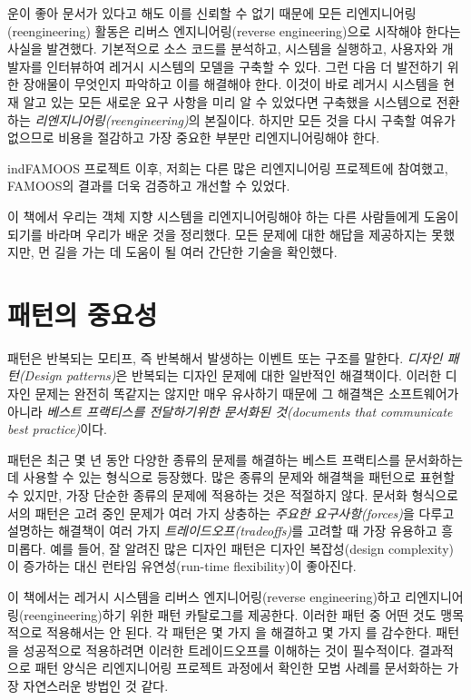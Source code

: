 \documentclass[a4paper,10pt,twoside]{book}
\begin{document}
운이 좋아 문서가 있다고 해도 이를 신뢰할 수 없기 때문에 모든 리엔지니어링(reengineering) 활동은 리버스 엔지니어링(reverse engineering)으로 시작해야 한다는 사실을 발견했다. 기본적으로 소스 코드를 분석하고, 시스템을 실행하고, 사용자와 개발자를 인터뷰하여 레거시 시스템의 모델을 구축할 수 있다. 그런 다음 더 발전하기 위한 장애물이 무엇인지 파악하고 이를 해결해야 한다. 이것이 바로 레거시 시스템을 현재 알고 있는 모든 새로운 요구 사항을 미리 알 수 있었다면 구축했을 시스템으로 전환하는 \emph{리엔지니어링(reengineering)}의 본질이다. 하지만 모든 것을 다시 구축할 여유가 없으므로 비용을 절감하고 가장 중요한 부분만 리엔지니어링해야 한다.

ind{FAMOOS} 프로젝트 이후, 저희는 다른 많은 리엔지니어링 프로젝트에 참여했고, FAMOOS의 결과를 더욱 검증하고 개선할 수 있었다.

이 책에서 우리는 객체 지향 시스템을 리엔지니어링해야 하는 다른 사람들에게 도움이 되기를 바라며 우리가 배운 것을 정리했다. 모든 문제에 대한 해답을 제공하지는 못했지만, 먼 길을 가는 데 도움이 될 여러 간단한 기술을 확인했다.

\section*{패턴의 중요성}
패턴은 반복되는 모티프, 즉 반복해서 발생하는 이벤트 또는 구조를 말한다. \emph{디자인 패턴(Design patterns)}은 반복되는 디자인 문제에 대한 일반적인 해결책이다\cite{Gamm95a}. 이러한 디자인 문제는 완전히 똑같지는 않지만 매우 유사하기 때문에 그 해결책은 소프트웨어가 아니라 \emph{베스트 프랙티스를 전달하기위한 문서화된 것(documents that communicate best practice)}이다.

패턴은 최근 몇 년 동안 다양한 종류의 문제를 해결하는 베스트 프랙티스를 문서화하는 데 사용할 수 있는 형식으로 등장했다. 많은 종류의 문제와 해결책을 패턴으로 표현할 수 있지만, 가장 단순한 종류의 문제에 적용하는 것은 적절하지 않다. 문서화 형식으로서의 패턴은 고려 중인 문제가 여러 가지 상충하는 \emph{주요한 요구사항(forces)}을 다루고 설명하는 해결책이 여러 가지 \emph{트레이드오프(tradeoffs)}를 고려할 때 가장 유용하고 흥미롭다. 예를 들어, 잘 알려진 많은 디자인 패턴은 디자인 복잡성(design complexity)이 증가하는 대신 런타임 유연성(run-time flexibility)이 좋아진다.

이 책에서는 레거시 시스템을 리버스 엔지니어링(reverse engineering)하고 리엔지니어링(reengineering)하기 위한 패턴 카탈로그를 제공한다. 이러한 패턴 중 어떤 것도 맹목적으로 적용해서는 안 된다. 각 패턴은 몇 가지 을 해결하고 몇 가지 를 감수한다. 패턴을 성공적으로 적용하려면 이러한 트레이드오프를 이해하는 것이 필수적이다. 결과적으로 패턴 양식은 리엔지니어링 프로젝트 과정에서 확인한 모범 사례를 문서화하는 가장 자연스러운 방법인 것 같다.
\end{document}
